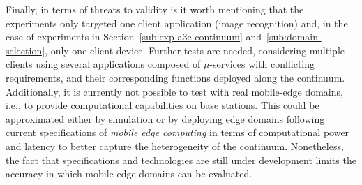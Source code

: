 



Finally, in terms of threats to validity is it worth mentioning that the experiments only targeted one client application (image recognition) and, in the case of experiments in Section~\ref{sub:exp-a3e-continuum} and~\ref{sub:domain-selection}, only one client device. Further tests are needed, considering multiple clients using several applications composed of $\mu$-services with conflicting requirements, and their corresponding functions deployed along the continuum. Additionally, it is currently not possible to test with real mobile-edge domains, i.e., to provide computational capabilities on base stations. This could be approximated either by simulation or by deploying edge domains following current specifications of \textit{mobile edge computing} in terms of computational power and latency to better capture the heterogeneity of the continuum. Nonetheless, the fact that specifications and technologies are still under development limits the accuracy in which mobile-edge domains can be evaluated.  %



